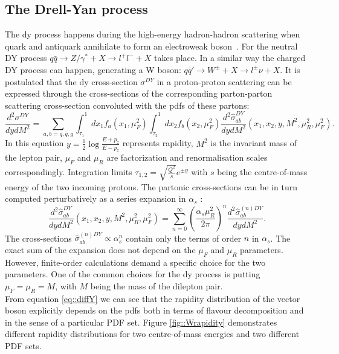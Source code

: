  		\subsection{The Drell-Yan process}
		The \gls{dy} process happens during the high-energy hadron-hadron scattering when quark and antiquark annihilate to form an electroweak boson~\cite{drellyan}. For the neutral DY process $q\bar q \rightarrow Z/\gamma^* + X \rightarrow l^{+}l^{-} + X$ takes place. In a similar way the charged DY process can happen, generating a W boson: $ q\bar q' \rightarrow W^{\pm} +X \rightarrow l^{\pm}\nu + X$. It is postulated that the \gls{dy} cross-section $\sigma^{DY} $ in a proton-proton scattering  can be expressed through the cross-sections of the corresponding parton-parton scattering cross-section convoluted with the \gls{pdf}s of these partons:
		\begin{equation}
		\frac{d^2\sigma^{DY}}{dydM^2}=\sum_{a,b=q,\bar q,g}\int_{\tau_1}^1 dx_1 f_a(x_1,\mu_F^2) \int_{\tau_2}^1 dx_2 f_b(x_2,\mu_F^2)\frac{d^2\hat{\sigma}_{ab}^{DY}}{dydM^2}(x_1,x_2,y,M^2,\mu_R^2,\mu_F^2).
		\label{eq::diffY}
		\end{equation}
		In this equation $y=\frac{1}{2}\log{\frac{E+p_z}{E-p_z}}$ represents rapidity, $M^2$ is the invariant mass of the lepton pair, $\mu_F$ and $\mu_R$ are factorization and renormalisation scales correspondingly. Integration limits $\tau_{1,2}=\sqrt{\frac{Q^2}{s}}e^{\pm y}$ with $s$ being the centre-of-mass energy of the two incoming protons. The partonic cross-sections can be in turn computed perturbatively as a series expansion in $\alpha_s$ \cite{proton_struct}:
		\begin{equation}
		\frac{d^2\hat{\sigma}_{ab}^{DY}}{dydM^2}(x_1,x_2,y,M^2,\mu_R^2,\mu_F^2)=\sum_{n=0}^{\infty}\left(\frac{\alpha_s\mu^2_R}{2\pi}\right)^n\frac{d^2\hat{\sigma}_{ab}^{(n)DY}}{dydM^2}.
		\end{equation}
		The cross-sections $\hat{\sigma}_{ab}^{(n)DY} \propto \alpha_s^n$ contain only the terms of order $n$ in $\alpha_s$. 
		The exact sum of the expansion does not depend on the $\mu_F$ and $\mu_R$ parameters. However, finite-order calculations demand a specific choice for the two parameters. One of the common choices for the \gls{dy} process is putting  $\mu_F=\mu_R=M$, with $M$ being the mass of the dilepton pair. \\
		From equation \ref{eq::diffY} we can see that the rapidity distribution of the vector boson explicitly depends on the \gls{pdf}s both in terms of flavour decomposition and in the sense of a particular PDF set. Figure \ref{fig::Wrapidity} demonstrates different rapidity distributions for two centre-of-mass energies and two different PDF sets.\\
